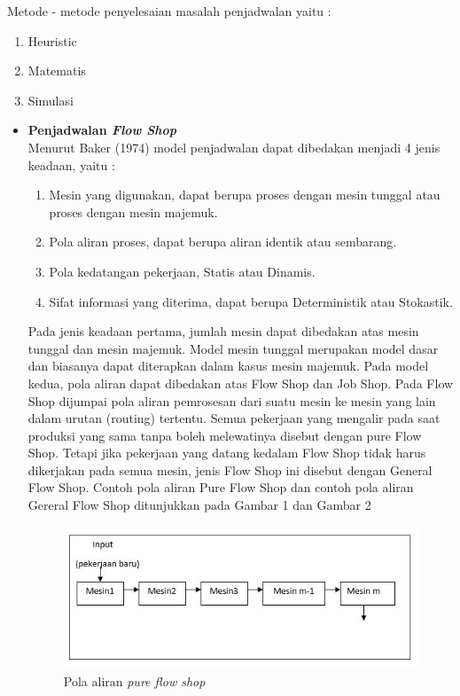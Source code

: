 \documentclass[a4paper,twoside]{article}
\begin{document}
\begin{enumerate}
\begin{itemize}
		Metode - metode penyelesaian masalah penjadwalan yaitu : 
		\begin{enumerate}
		\item Heuristic
		\item Matematis
		\item Simulasi
		\end{enumerate}
		\end{itemize}
		
		
		\begin{itemize}
		\item{\bf Penjadwalan {\it Flow Shop}}\\
		Menurut Baker (1974) model penjadwalan dapat dibedakan menjadi 4 jenis keadaan, yaitu :
		\begin{enumerate}
		\item Mesin yang digunakan, dapat berupa proses dengan mesin tunggal atau proses dengan mesin majemuk.
		\item Pola aliran proses, dapat berupa aliran identik atau sembarang.
		\item Pola kedatangan pekerjaan, Statis atau Dinamis.
		\item Sifat informasi yang diterima, dapat berupa Deterministik atau Stokastik.
		\end{enumerate}
		Pada jenis keadaan pertama, jumlah mesin dapat dibedakan atas mesin tunggal dan mesin majemuk. Model mesin tunggal merupakan model dasar dan biasanya dapat diterapkan dalam kasus mesin majemuk.
		Pada model kedua, pola aliran dapat dibedakan atas Flow Shop dan Job Shop. Pada Flow Shop dijumpai pola aliran pemrosesan dari suatu mesin ke mesin yang lain dalam urutan (routing) tertentu. Semua pekerjaan yang mengalir pada saat produksi yang sama tanpa boleh melewatinya disebut dengan pure Flow Shop. Tetapi jika pekerjaan yang datang kedalam Flow Shop tidak harus dikerjakan pada semua mesin, jenis Flow Shop ini disebut dengan General Flow Shop. Contoh pola aliran Pure Flow Shop dan contoh pola aliran Gereral Flow Shop ditunjukkan pada Gambar 1 dan Gambar 2
		
		\begin{figure}[H]
			\centering
			\includegraphics[scale=0.60]{gambar1}
			\caption[Pure Flow Shop] {Pola aliran \it{pure flow shop}}
			\label{fig:pureflowshop}
		\end{figure}
	

\end{itemize}
\end{enumerate}
\end{document}
